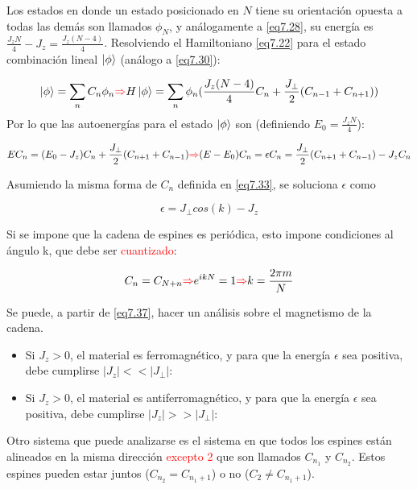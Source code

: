 \documentclass{book}
\begin{document}
Los estados en donde un estado posicionado en $N$ tiene su orientación opuesta a todas las demás son llamados $\phi_N$, y análogamente a \ref{eq7.28}, su energía es $\frac{J_z N}{4}-J_z=\frac{J_z(N-4)}{4}$. Resolviendo el Hamiltoniano \ref{eq7.22} para el estado combinación lineal $\ket{\phi}$ (análogo a \ref{eq7.30}):

\begin{equation}\label{eq7.35}\ket{\phi}=\sum_n C_n \phi_n\textcolor{red}{\Rightarrow} H\ket{\phi}= \sum_n \phi_n(\frac{J_z(N-4)}{4}C_n+\frac{J_\perp}{2}(C_{n-1}+C_{n+1})) \end{equation}
Por lo que las autoenergías para el estado $\ket{\phi}$ son (definiendo $E_0=\frac{J_zN}{4}$):

\begin{equation}\label{eq7.36}EC_n=(E_0-J_z)C_n+\frac{J_\perp}{2}(C_{n+1}+C_{n-1})\textcolor{red}{\Rightarrow}(E-E_0)C_n=\epsilon C_n=\frac{J_\perp}{2}(C_{n+1}+C_{n-1})-J_zC_n\end{equation}

Asumiendo la misma forma de $C_n$ definida en \ref{eq7.33}, se soluciona $\epsilon$ como

\begin{equation}\label{eq7.37}\epsilon=J_\perp cos(k)-J_z\end{equation}

Si se impone que la cadena de espines es periódica, esto impone condiciones al ángulo k, que debe ser \textcolor{red}{cuantizado}:

\begin{equation}\label{eq7.38}C_n=C_{N+n}\textcolor{red}{\Rightarrow} e^{ikN}=1 \textcolor{red}{\Rightarrow} k=\frac{2\pi m}{N} \end{equation}

Se puede, a partir de \ref{eq7.37}, hacer un análisis sobre el magnetismo de la cadena.
\begin{itemize}
    \item Si $J_z>0$, el material es ferromagnético, y para que la energía $\epsilon$ sea positiva, debe cumplirse $\lvert J_z\rvert << \lvert J_\perp\rvert$:
    \item Si $J_z>0$, el material es antiferromagnético, y para que la energía $\epsilon$ sea positiva, debe cumplirse $\lvert J_z\rvert >> \lvert J_\perp\rvert$:
\end{itemize}

Otro sistema que puede analizarse es el sistema en que todos los espines están alineados en la misma dirección \textcolor{red}{excepto 2} que son llamados $C_{n_1}$ y $C_{n_2}$. Estos espines pueden estar juntos ($C_{n_2}=C_{n_1+1}$) o no ($C_2\neq C_{n_1+1}$).
\end{document}
